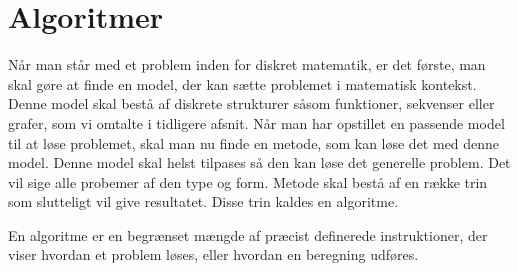 \chapter{Algoritmer} \label{kap.algo}
Når man står med et problem inden for diskret matematik, er det første, man skal gøre at finde en model, der kan sætte problemet i matematisk kontekst. Denne model skal bestå af diskrete strukturer såsom funktioner, sekvenser eller grafer, som vi omtalte i tidligere afsnit. Når man har opstillet en passende model til at løse problemet, skal man nu finde en metode, som kan løse det med denne model. Denne model skal helst tilpases så den kan løse det generelle problem. Det vil sige alle probemer af den type og form. Metode skal bestå af en række trin som slutteligt vil give resultatet. Disse trin kaldes en algoritme. 
\begin{defn}
[Algoritmer] En algoritme er en begrænset mængde af præcist definerede instruktioner, der viser hvordan et problem løses, eller hvordan en beregning udføres. 

\end{defn}





